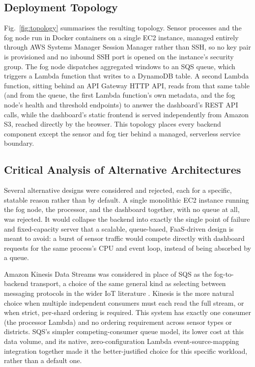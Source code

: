 \documentclass[conference]{IEEEtran}
\begin{document}
\subsection{Deployment Topology}
Fig.~\ref{fig:topology} summarises the resulting topology. Sensor processes and the fog node run in Docker containers on a single EC2 instance, managed entirely through AWS Systems Manager Session Manager rather than SSH, so no key pair is provisioned and no inbound SSH port is opened on the instance's security group. The fog node dispatches aggregated windows to an SQS queue, which triggers a Lambda function that writes to a DynamoDB table. A second Lambda function, sitting behind an API Gateway HTTP API, reads from that same table (and from the queue, the first Lambda function's own metadata, and the fog node's health and threshold endpoints) to answer the dashboard's REST API calls, while the dashboard's static frontend is served independently from Amazon S3, reached directly by the browser. This topology places every backend component except the sensor and fog tier behind a managed, serverless service boundary.

\subsection{Critical Analysis of Alternative Architectures}
Several alternative designs were considered and rejected, each for a specific, statable reason rather than by default. A single monolithic EC2 instance running the fog node, the processor, and the dashboard together, with no queue at all, was rejected. It would collapse the backend into exactly the single point of failure and fixed-capacity server that a scalable, queue-based, FaaS-driven design is meant to avoid: a burst of sensor traffic would compete directly with dashboard requests for the same process's CPU and event loop, instead of being absorbed by a queue.

Amazon Kinesis Data Streams was considered in place of SQS as the fog-to-backend transport, a choice of the same general kind as selecting between messaging protocols in the wider IoT literature \cite{ref16}. Kinesis is the more natural choice when multiple independent consumers must each read the full stream, or when strict, per-shard ordering is required. This system has exactly one consumer (the processor Lambda) and no ordering requirement across sensor types or districts. SQS's simpler competing-consumer queue model, its lower cost at this data volume, and its native, zero-configuration Lambda event-source-mapping integration together made it the better-justified choice for this specific workload, rather than a default one.
\end{document}
